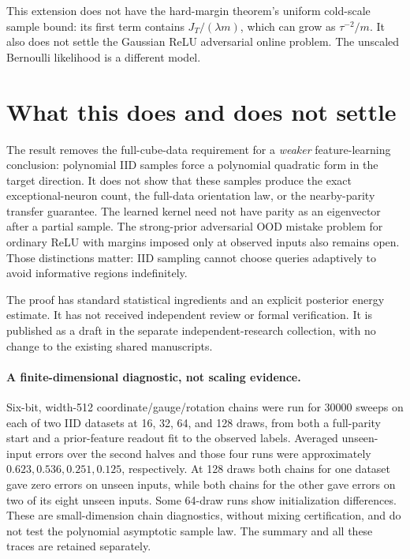 \documentclass[11pt]{article}
\begin{document}
This extension does not have the hard-margin theorem's uniform cold-scale
sample bound: its first term contains $J_T/(\lambda m)$, which can grow
as $\tau^{-2}/m$. It also does not settle the Gaussian ReLU adversarial
online problem. The unscaled Bernoulli likelihood is a different model.

\section{What this does and does not settle}
The result removes the full-cube-data requirement for a \emph{weaker}
feature-learning conclusion: polynomial IID samples force a polynomial
quadratic form in the target direction. It does not show that these
samples produce the exact exceptional-neuron count, the full-data
orientation law, or the nearby-parity transfer guarantee. The learned
kernel need not have parity as an eigenvector after a partial sample.
The strong-prior adversarial OOD mistake problem for ordinary ReLU with
margins imposed only at observed inputs also remains open. Those distinctions matter: IID sampling cannot choose
queries adaptively to avoid informative regions indefinitely.

The proof has standard statistical ingredients and an explicit posterior
energy estimate. It has not received independent review or formal verification.
It is published as a draft in the separate independent-research collection,
with no change to the existing shared manuscripts.

\paragraph{A finite-dimensional diagnostic, not scaling evidence.}
Six-bit, width-512 coordinate/gauge/rotation chains were run for 30000
sweeps on each of two IID datasets at 16, 32, 64, and 128 draws, from
both a full-parity start and a prior-feature readout fit to the observed
labels. Averaged unseen-input errors over the second halves and those
four runs were approximately $0.623,0.536,0.251,0.125$, respectively.
At 128 draws both chains for one dataset gave zero errors on unseen
inputs, while both chains for the other gave errors on two of its eight
unseen inputs. Some 64-draw runs show
initialization differences. These are small-dimension chain diagnostics,
without mixing certification, and do not test the polynomial asymptotic
sample law. The summary and all these traces are retained separately.
\end{document}
